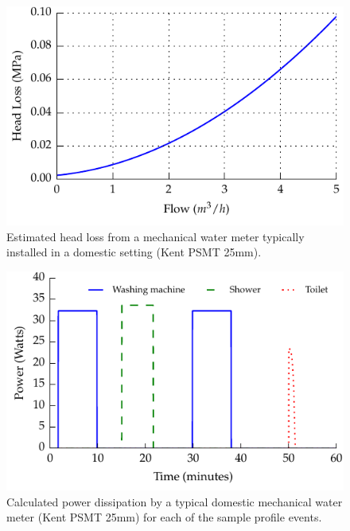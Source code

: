 \documentclass[10pt,final,journal]{IEEEtran}
\begin{document}
    \begin{figure}
        \begin{center}
        \includegraphics[width=\linewidth]{graph_pressureLoss}
        \end{center}
        \caption{Estimated head loss from a mechanical water meter typically installed in a domestic setting (Kent PSMT 25mm).}
        \label{fig:headloss}
    \end{figure}

    \begin{figure}
        \begin{center}
        \includegraphics[width=\linewidth]{graph_harvest}
        \end{center}
        \caption{Calculated power dissipation by a typical domestic mechanical water meter (Kent PSMT 25mm) for each of the sample profile events.}
        \label{fig:powerDissipated_meter}
    \end{figure}
\end{document}
